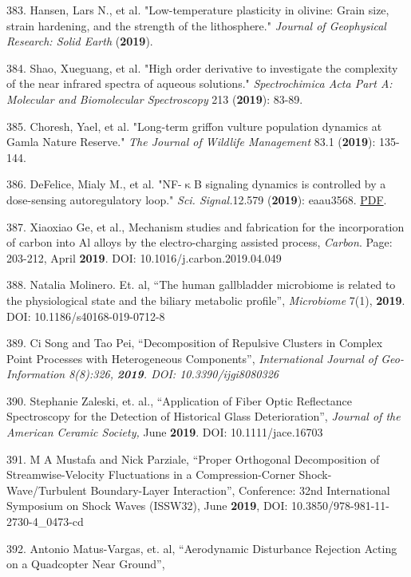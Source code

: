 383. Hansen, Lars N., et al. "Low-temperature plasticity in olivine: Grain size, strain hardening, and the strength of the lithosphere." \textit{Journal of Geophysical Research: Solid Earth} (\textbf{2019}).

384. Shao, Xueguang, et al. "High order derivative to investigate the complexity of the near infrared spectra of aqueous solutions." \textit{Spectrochimica Acta Part A: Molecular and Biomolecular Spectroscopy} 213 (\textbf{2019}): 83-89.

385. Choresh, Yael, et al. "Long-term griffon vulture population dynamics at Gamla Nature Reserve." \textit{The Journal of Wildlife Management} 83.1 (\textbf{2019}): 135-144.

386. DeFelice, Mialy M., et al. "NF-${\upkappa}$B signaling dynamics is controlled by a dose-sensing autoregulatory loop." \textit{Sci. Signal.}12.579 (\textbf{2019}): eaau3568. \href{https://stke.sciencemag.org/content/12/579/eaau3568/tab-pdf}{PDF}.

387. Xiaoxiao Ge, et al., Mechanism studies and fabrication for the incorporation of carbon into Al alloys by the electro-charging assisted process, \textit{Carbon}. \textcolor{color-25}{Page: 203-212,} April \textbf{2019}. DOI: 10.1016/j.carbon.2019.04.049

388. Natalia Molinero. Et. al, ``The human gallbladder microbiome is related to the physiological state and the biliary metabolic profile'', \textit{Microbiome} 7(1), \textbf{2019}. DOI: 10.1186/s40168-019-0712-8

389. Ci Song and Tao Pei, ``Decomposition of Repulsive Clusters in Complex Point Processes with Heterogeneous Components'', \textit{International Journal of Geo-Information 8(8):326,} \textbf{\textit{2019}}\textit{. DOI: 10.3390/ijgi8080326}

390. Stephanie Zaleski, et. al., ``Application of Fiber Optic Reflectance Spectroscopy for the Detection of Historical Glass Deterioration'', \textit{Journal of the American Ceramic Society,} June \textbf{2019}. DOI: 10.1111/jace.16703

391. M A Mustafa and Nick Parziale, ``Proper Orthogonal Decomposition of Streamwise-Velocity Fluctuations in a Compression-Corner Shock-Wave/Turbulent Boundary-Layer Interaction'', Conference: 32nd International Symposium on Shock Waves (ISSW32), June \textbf{2019}, DOI: 10.3850/978-981-11-2730-4\_0473-cd

392. Antonio Matus-Vargas, et. al, ``Aerodynamic Disturbance Rejection Acting on a Quadcopter Near Ground'', 

